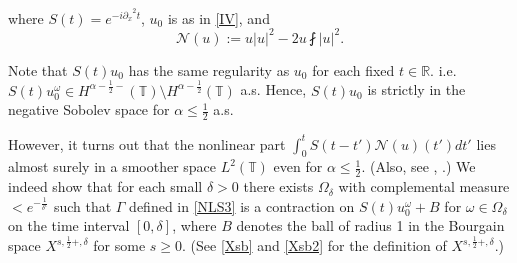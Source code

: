 \documentclass[11pt]{amsart}
\numberwithin{equation}{section} \numberwithin{theorem}{section}
\begin{document}
{
\noindent} where $S(t) = e^{-i {
\partial_x}^2 t}$, $u_0$ is as in \eqref{IV}, and \[\mathcal{N}(u) := u |u|^2 - 2u \fint |u|^2.\] 

{
\noindent}
Note that $S(t) u_0$ has the same regularity as $u_0$ for each fixed $t \in \mathbb{R}$. i.e. $S(t) u^\omega_0 \in H^{{\alpha}-\frac{1}{2}-} (\mathbb{T})\setminus H^{{\alpha}-\frac{1}{2}}(\mathbb{T})$ a.s. Hence, $S(t)u_0$ is strictly in the negative Sobolev space for ${\alpha} \leq \frac{1}{2}$ a.s.

However, it turns out that 
the nonlinear part $\int_0^t S(t - t') \mathcal{N}(u) (t') d t'$ lies 
almost surely in a smoother space $L^2 (\mathbb{T})$ even for ${\alpha} \leq \frac{1}{2}$. 
(Also, see \cite{Bourgain:1996p446}, \cite{Burq:2008p624}.) 
We indeed show that for each small ${\delta}> 0$ there exists $\Omega_{\delta}$ 
with complemental measure $< e^{-\frac{1}{{\delta}^c}}$ such that ${\Gamma}$ defined in \eqref{NLS3} 
is a contraction on $S(t) u_0^\omega + B$ for $\omega \in \Omega_{\delta}$ on the time interval $[0, {\delta}]$, 
where $B$ denotes the ball of radius 1 in the Bourgain space $X^{s, \frac{1}{2}+, {\delta}}$ for some $s \geq 0$.
(See \eqref{Xsb} and \eqref{Xsb2} for the definition of $X^{s, \frac{1}{2}+, {\delta}}$.) 
\end{document}

